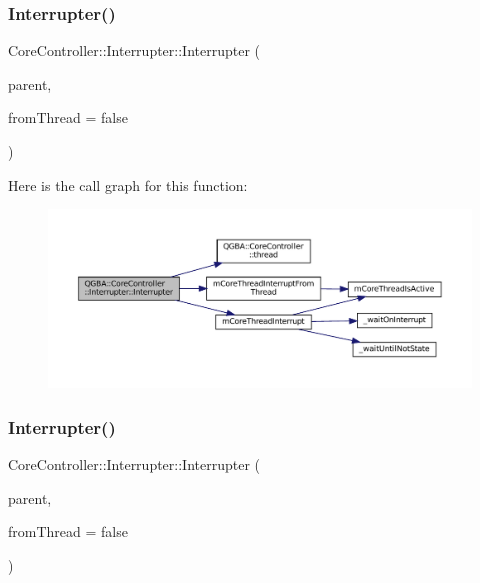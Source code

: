 \subsubsection{\texorpdfstring{Interrupter()}{Interrupter()}\hspace{0.1cm}{\footnotesize\ttfamily [1/3]}}
{\footnotesize\ttfamily Core\+Controller\+::\+Interrupter\+::\+Interrupter (\begin{DoxyParamCaption}\item[{\mbox{\hyperlink{class_q_g_b_a_1_1_core_controller}{Core\+Controller}} $\ast$}]{parent,  }\item[{\mbox{\hyperlink{libretro_8h_a4a26dcae73fb7e1528214a068aca317e}{bool}}}]{from\+Thread = {\ttfamily false} }\end{DoxyParamCaption})}

Here is the call graph for this function\+:
\nopagebreak
\begin{figure}[H]
\begin{center}
\leavevmode
\includegraphics[width=350pt]{class_q_g_b_a_1_1_core_controller_1_1_interrupter_a0d18068a19626d31acd0f46981389b3b_cgraph}
\end{center}
\end{figure}
\mbox{\label{class_q_g_b_a_1_1_core_controller_1_1_interrupter_a049d273dc9f81e8f92f063dab82851e0}} 
\subsubsection{\texorpdfstring{Interrupter()}{Interrupter()}\hspace{0.1cm}{\footnotesize\ttfamily [2/3]}}
{\footnotesize\ttfamily Core\+Controller\+::\+Interrupter\+::\+Interrupter (\begin{DoxyParamCaption}\item[{std\+::shared\+\_\+ptr$<$ \mbox{\hyperlink{class_q_g_b_a_1_1_core_controller}{Core\+Controller}} $>$}]{parent,  }\item[{\mbox{\hyperlink{libretro_8h_a4a26dcae73fb7e1528214a068aca317e}{bool}}}]{from\+Thread = {\ttfamily false} }\end{DoxyParamCaption})}

